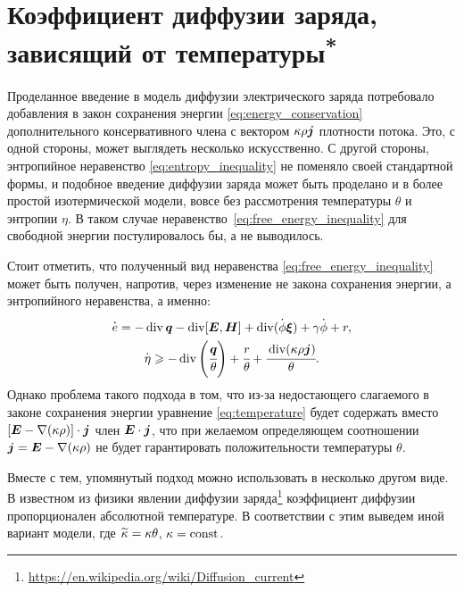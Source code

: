 
\section[Коэффициент диффузии заряда, зависящий от температуры\textsuperscript{*}]{Коэффициент диффузии заряда, \\ зависящий от температуры\textsuperscript{*}}

Проделанное введение в модель диффузии электрического заряда потребовало добавления в закон сохранения энергии \eqref{eq:energy_conservation} дополнительного консервативного члена с вектором $\kappa \rho {\boldsymbol{j}}$ плотности потока. Это, с одной стороны, может выглядеть несколько искусственно. С другой стороны, энтропийное неравенство \eqref{eq:entropy_inequality} не поменяло своей стандартной формы, и подобное введение диффузии заряда может быть проделано и в более простой изотермической модели, вовсе без рассмотрения температуры $\theta$ и энтропии $\eta$. В таком случае неравенство~\eqref{eq:free_energy_inequality} для свободной энергии постулировалось бы, а не выводилось.

Стоит отметить, что полученный вид неравенства \eqref{eq:free_energy_inequality} может быть получен, напротив, через изменение не закона сохранения энергии, а энтропийного неравенства, а именно:
\begin{gather}
    \overset{\boldsymbol{.}}{e} = -\operatorname{{div}} {\boldsymbol{q}} - \operatorname{{div}}[{\boldsymbol{E}}, \boldsymbol{H}] + \operatorname{{div}}(\overset{\boldsymbol{.}}{\phi} {\boldsymbol{\xi}}) + \gamma \overset{\boldsymbol{.}}{\phi} + r,
    \label{eq:energy_conservation_basic} \\
    \overset{\boldsymbol{.}}{\eta} \geqslant -\operatorname{{div}} \left( \cfrac{{\boldsymbol{q}}}{\theta} \right) + \cfrac{r}{\theta} + \cfrac{\operatorname{{div}}(\kappa \rho {\boldsymbol{j}})}{\theta}.
    \nonumber
\end{gather}
Однако проблема такого подхода в том, что из-за недостающего слагаемого в законе сохранения энергии уравнение \eqref{eq:temperature} будет содержать вместо $[{\boldsymbol{E}} - \nabla (\kappa \rho)] \cdot {\boldsymbol{j}}$ член ${\boldsymbol{E}} \cdot {\boldsymbol{j}}$, что при желаемом определяющем соотношении ${\boldsymbol{j}} = {\boldsymbol{E}} - \nabla (\kappa \rho)$ не будет гарантировать положительности температуры $\theta$.

Вместе с тем, упомянутый подход можно использовать в несколько другом виде. В известном из физики явлении диффузии заряда\footnote{\url{https://en.wikipedia.org/wiki/Diffusion_current}} коэффициент диффузии пропорционален абсолютной температуре. В соответствии с этим выведем иной вариант модели, где $\widetilde{\kappa} \hm = \kappa \theta$, $\kappa = \operatorname{{const}}$.

